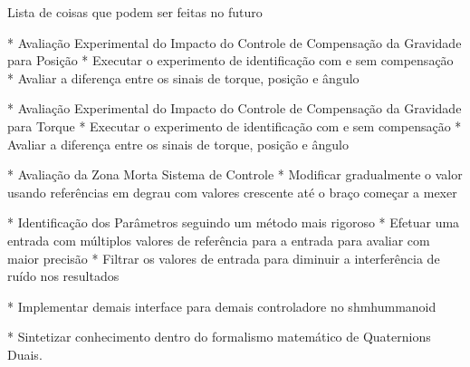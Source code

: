 Lista de coisas que podem ser feitas no futuro

* Avaliação Experimental do Impacto do Controle de Compensação da Gravidade para Posição
  * Executar o experimento de identificação com e sem compensação
  * Avaliar a diferença entre os sinais de torque, posição e ângulo
 
* Avaliação Experimental do Impacto do Controle de Compensação da Gravidade para Torque
  * Executar o experimento de identificação com e sem compensação
  * Avaliar a diferença entre os sinais de torque, posição e ângulo

* Avaliação da Zona Morta Sistema de Controle
 * Modificar gradualmente o valor usando referências em degrau com valores crescente até o braço começar a mexer
 
* Identificação dos Parâmetros seguindo um método mais rigoroso
 * Efetuar uma entrada com múltiplos valores de referência para a entrada para avaliar com maior precisão
 * Filtrar os valores de entrada para diminuir a interferência de ruído nos resultados
 
 * Implementar demais interface para demais controladore no shmhummanoid
 
 * Sintetizar conhecimento dentro do formalismo matemático de Quaternions Duais.